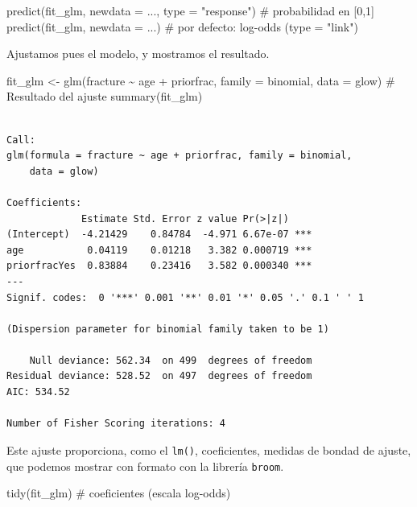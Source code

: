 \documentclass[
  letterpaper,
  DIV=11,
  numbers=noendperiod]{scrartcl}
\newenvironment{Shaded}{\begin{snugshade}}{\end{snugshade}}
\newcommand{\AttributeTok}[1]{\textcolor[rgb]{0.40,0.45,0.13}{#1}}
\newcommand{\CommentTok}[1]{\textcolor[rgb]{0.37,0.37,0.37}{#1}}
\newcommand{\FunctionTok}[1]{\textcolor[rgb]{0.28,0.35,0.67}{#1}}
\newcommand{\NormalTok}[1]{\textcolor[rgb]{0.00,0.23,0.31}{#1}}
\newcommand{\OtherTok}[1]{\textcolor[rgb]{0.00,0.23,0.31}{#1}}
\newcommand{\SpecialCharTok}[1]{\textcolor[rgb]{0.37,0.37,0.37}{#1}}
\newcommand{\StringTok}[1]{\textcolor[rgb]{0.13,0.47,0.30}{#1}}
\begin{document}
\begin{tcolorbox}
\begin{Shaded}
\begin{Highlighting}[]
\FunctionTok{predict}\NormalTok{(fit\_glm, }\AttributeTok{newdata =}\NormalTok{ ..., }\AttributeTok{type =} \StringTok{"response"}\NormalTok{)    }\CommentTok{\# probabilidad en [0,1]}
\FunctionTok{predict}\NormalTok{(fit\_glm, }\AttributeTok{newdata =}\NormalTok{ ...)                       }\CommentTok{\# por defecto: log{-}odds (type = "link")}
\end{Highlighting}
\end{Shaded}

\end{tcolorbox}

Ajustamos pues el modelo, y mostramos el resultado.

\begin{Shaded}
\begin{Highlighting}[]
\NormalTok{fit\_glm }\OtherTok{\textless{}{-}} \FunctionTok{glm}\NormalTok{(fracture }\SpecialCharTok{\textasciitilde{}}\NormalTok{ age }\SpecialCharTok{+}\NormalTok{ priorfrac, }\AttributeTok{family =}\NormalTok{ binomial, }\AttributeTok{data =}\NormalTok{ glow)}
\CommentTok{\# Resultado del ajuste}
\FunctionTok{summary}\NormalTok{(fit\_glm)}
\end{Highlighting}
\end{Shaded}

\begin{verbatim}

Call:
glm(formula = fracture ~ age + priorfrac, family = binomial, 
    data = glow)

Coefficients:
             Estimate Std. Error z value Pr(>|z|)    
(Intercept)  -4.21429    0.84784  -4.971 6.67e-07 ***
age           0.04119    0.01218   3.382 0.000719 ***
priorfracYes  0.83884    0.23416   3.582 0.000340 ***
---
Signif. codes:  0 '***' 0.001 '**' 0.01 '*' 0.05 '.' 0.1 ' ' 1

(Dispersion parameter for binomial family taken to be 1)

    Null deviance: 562.34  on 499  degrees of freedom
Residual deviance: 528.52  on 497  degrees of freedom
AIC: 534.52

Number of Fisher Scoring iterations: 4
\end{verbatim}

Este ajuste proporciona, como el \texttt{lm()}, coeficientes, medidas de
bondad de ajuste, que podemos mostrar con formato con la librería
\texttt{broom}.

\begin{Shaded}
\begin{Highlighting}[]
\FunctionTok{tidy}\NormalTok{(fit\_glm)                                     }\CommentTok{\# coeficientes (escala log{-}odds)}
\end{Highlighting}
\end{Shaded}
\end{document}
